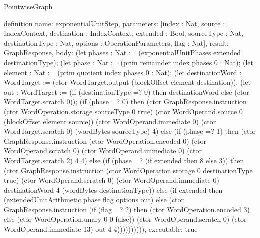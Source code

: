 \begin{lexlean}{PointwiseGraph}
\begin{semanticmodule}
definition{
  name: exponentialUnitStep,
  parameters: [index : Nat, source : IndexContext, destination : IndexContext, extended : Bool, sourceType : Nat, destinationType : Nat, options : OperationParameters, flag : Nat],
  result: GraphResponse,
  body: (let phases : Nat := (exponentialUnitPhases extended destinationType);
    (let phase : Nat := (prim remainder index phases 0 : Nat);
    (let element : Nat := (prim quotient index phases 0 : Nat);
    (let destinationWord : WordTarget := (ctor WordTarget.output (blockOffset element destination));
    (let out : WordTarget := (if (destinationType =? 0) then destinationWord else (ctor WordTarget.scratch 0));
    (if (phase =? 0) then (ctor GraphResponse.instruction (ctor WordOperation.storage sourceType 0 true) (ctor WordOperand.source 0 (blockOffset element source)) (ctor WordOperand.immediate 0) (ctor WordTarget.scratch 0) (wordBytes sourceType) 4) else (if (phase =? 1) then (ctor GraphResponse.instruction (ctor WordOperation.encoded 0) (ctor WordOperand.scratch 0) (ctor WordOperand.immediate 0) (ctor WordTarget.scratch 2) 4 4) else (if (phase =? (if extended then 8 else 3)) then (ctor GraphResponse.instruction (ctor WordOperation.storage 0 destinationType true) (ctor WordOperand.scratch 0) (ctor WordOperand.immediate 0) destinationWord 4 (wordBytes destinationType)) else (if extended then (extendedUnitArithmetic phase flag options out) else (ctor GraphResponse.instruction (if (flag =? 2) then (ctor WordOperation.encoded 3) else (ctor WordOperation.unary 0 0 false)) (ctor WordOperand.scratch 0) (ctor WordOperand.immediate 13) out 4 4)))))))))),
  executable: true
}


\end{semanticmodule}
\end{lexlean}

